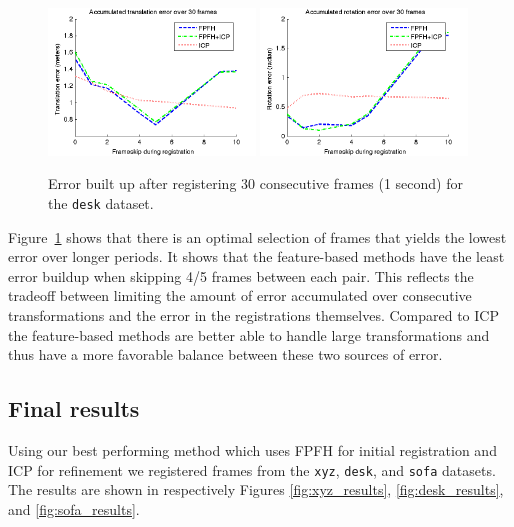 \documentclass[a4paper]{article}
\begin{document}
\begin{figure}[htbp]
    \centering
        \includegraphics[width=0.49\textwidth]{ims/deskAccumulatedtranslationerrorover30frames.png}
        \includegraphics[width=0.49\textwidth]{ims/deskAccumulatedrotationerrorover30frames.png}
    \caption{Error built up after registering 30 consecutive frames (1 second) for the \texttt{desk} dataset.}
    \label{fig:accumulated_error}
\end{figure}

Figure~\ref{fig:accumulated_error} shows that there is an optimal selection of frames that yields the lowest error over longer periods. It shows that the feature-based methods have the least error buildup when skipping 4/5 frames between each pair. This reflects the tradeoff between limiting the amount of error accumulated over consecutive transformations and the error in the registrations themselves. Compared to \ac{ICP} the feature-based methods are better able to handle large transformations and thus have a more favorable balance between these two sources of error.

\subsection{Final results}

Using our best performing method which uses \ac{FPFH} for initial registration and \ac{ICP} for refinement we registered frames from the \texttt{xyz}, \texttt{desk}, and \texttt{sofa} datasets. The results are shown in respectively Figures \ref{fig:xyz_results}, \ref{fig:desk_results}, and \ref{fig:sofa_results}.
\end{document}
